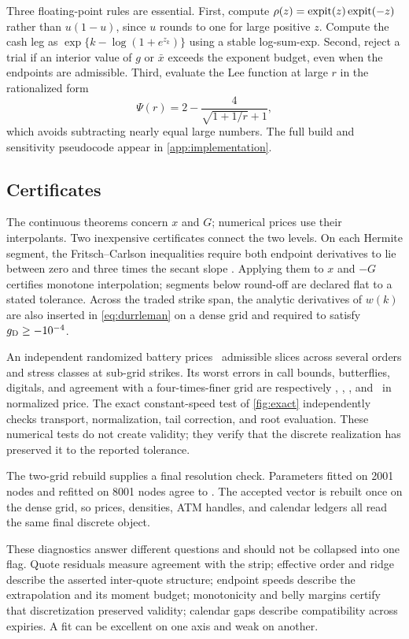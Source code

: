 Three floating-point rules are essential.  First, compute
$\rho(z)=\operatorname{expit}(z)\operatorname{expit}(-z)$ rather than $u(1-u)$, since $u$ rounds to one
for large positive $z$.  Compute the cash leg as
$\exp\{k-\log(1+e^{z_k})\}$ using a stable log-sum-exp.  Second, reject a
trial if an interior value of $g$ or $\bar x$ exceeds the exponent budget,
even when the endpoints are admissible.  Third, evaluate the Lee function at
large $r$ in the rationalized form
\begin{equation}
\Psi(r)=2-\frac4{\sqrt{1+1/r}+1},
\label{eq:leestable}
\end{equation}
which avoids subtracting nearly equal large numbers.  The full build and
sensitivity pseudocode appear in \cref{app:implementation}.

\subsection{Certificates}
\label{sec:certificates}

The continuous theorems concern $x$ and $G$; numerical prices use their
interpolants.  Two inexpensive certificates connect the two levels.  On each
Hermite segment, the Fritsch--Carlson inequalities require both endpoint
derivatives to lie between zero and three times the secant slope
\citep{FritschCarlson1980}.  Applying them to $x$ and $-G$ certifies monotone
interpolation; segments below round-off are declared flat to a stated
tolerance.  Across the traded strike span, the analytic derivatives of
$w(k)$ are also inserted in \eqref{eq:durrleman} on a dense grid and required
to satisfy $g_{\rm D}\ge-10^{-4}$.

An independent randomized battery prices \MacCertSlices\ admissible
slices across several orders and stress classes at sub-grid strikes.  Its
worst errors in call bounds, butterflies, digitals, and agreement with a
four-times-finer grid are respectively
\MacCertWorstBounds, \MacCertWorstButterfly, \MacCertWorstDigital, and
\MacCertGridAgree\ in normalized price.  The exact constant-speed test
of \cref{fig:exact} independently checks transport, normalization, tail
correction, and root evaluation.  These numerical tests do not create
validity; they verify that the discrete realization has preserved it to the
reported tolerance.

The two-grid rebuild supplies a final resolution check.  Parameters fitted on
2001 nodes and refitted on 8001 nodes agree to \MacTwoGridParamAgree.  The
accepted vector is rebuilt once on the dense grid, so prices, densities, ATM
handles, and calendar ledgers all read the same final discrete object.

These diagnostics answer different questions and should not be collapsed
into one flag.  Quote residuals measure agreement with the strip; effective
order and ridge describe the asserted inter-quote structure; endpoint speeds
describe the extrapolation and its moment budget; monotonicity and belly
margins certify that discretization preserved validity; calendar gaps
describe compatibility across expiries.  A fit can be excellent on one axis
and weak on another.
